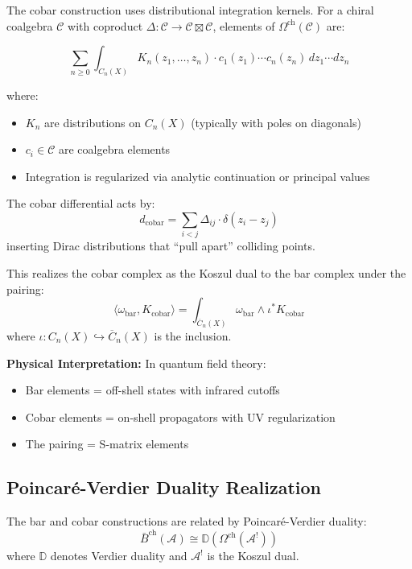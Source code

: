 \begin{example}\label{ex:cobar-kernels}
The cobar construction uses distributional integration kernels. For a chiral coalgebra $\mathcal{C}$ 
with coproduct $\Delta: \mathcal{C} \to \mathcal{C} \boxtimes \mathcal{C}$, elements of $\Omega^{\text{ch}}(\mathcal{C})$ are:

$$\sum_{n \geq 0} \int_{C_n(X)} K_n(z_1, \ldots, z_n) \cdot c_1(z_1) \cdots c_n(z_n) \, dz_1 \cdots dz_n$$

where:
\begin{itemize}
\item $K_n$ are distributions on $C_n(X)$ (typically with poles on diagonals)
\item $c_i \in \mathcal{C}$ are coalgebra elements  
\item Integration is regularized via analytic continuation or principal values
\end{itemize}

The cobar differential acts by:
$$d_{\text{cobar}} = \sum_{i<j} \Delta_{ij} \cdot \delta(z_i - z_j)$$
inserting Dirac distributions that ``pull apart'' colliding points.

This realizes the cobar complex as the Koszul dual to the bar complex under the pairing:
$$\langle \omega_{\text{bar}}, K_{\text{cobar}} \rangle = \int_{\overline{C}_n(X)} \omega_{\text{bar}} \wedge \iota^* K_{\text{cobar}}$$
where $\iota: C_n(X) \hookrightarrow \overline{C}_n(X)$ is the inclusion.

\textbf{Physical Interpretation:} In quantum field theory:
\begin{itemize}
\item Bar elements = off-shell states with infrared cutoffs
\item Cobar elements = on-shell propagators with UV regularization  
\item The pairing = S-matrix elements
\end{itemize}
\end{example}

\subsection{Poincaré-Verdier Duality Realization}

\begin{theorem}\label{thm:poincare-verdier}
The bar and cobar constructions are related by Poincaré-Verdier duality:
\[
\bar{B}^{\text{ch}}(\mathcal{A}) \cong \mathbb{D}(\Omega^{\text{ch}}(\mathcal{A}^!))
\]
where $\mathbb{D}$ denotes Verdier duality and $\mathcal{A}^!$ is the Koszul dual.
\end{theorem}

